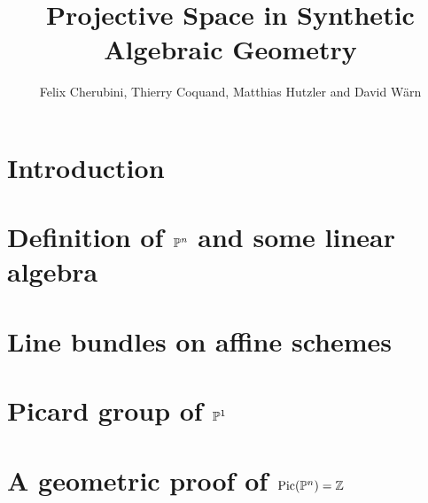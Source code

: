 \documentclass{../util/zariski-small}
\title{Projective Space in Synthetic Algebraic Geometry}
\begin{document}
\author{Felix Cherubini, Thierry Coquand, Matthias Hutzler and David Wärn}

\maketitle

\section*{Introduction}


\section[Definition of projective space and some linear algebra]{Definition of $\mathbb{P}^n$ and some linear algebra}


%

\section{Line bundles on affine schemes}


\section[Picard group of projective space]{Picard group of $\mathbb{P}^1$}


\section[Picard group of projective space (geometric)]{A geometric proof of $\mathrm{Pic}(\mathbb{P}^n)=\mathbb{Z}$}
\label{geometric-proof}


\newpage



\printindex

\printbibliography
\end{document}

